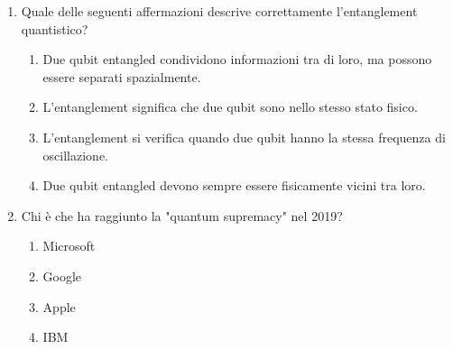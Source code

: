 \documentclass[10pt]{article}
\begin{document}
\begin{enumerate}[label=\textbf{Domanda \arabic*.}]
\item Quale delle seguenti affermazioni descrive correttamente l'entanglement quantistico?
\begin{enumerate}[label=\Alph*.]
    \item Due qubit entangled condividono informazioni tra di loro, ma possono essere separati spazialmente.
    \item L'entanglement significa che due qubit sono nello stesso stato fisico.
    \item L'entanglement si verifica quando due qubit hanno la stessa frequenza di oscillazione.
    \item Due qubit entangled devono sempre essere fisicamente vicini tra loro.
\end{enumerate}



\item Chi è che ha raggiunto la "quantum supremacy" nel 2019?
\begin{enumerate}[label=\Alph*.]
    \item Microsoft
    \item Google
    \item Apple
    \item IBM
\end{enumerate}

\end{enumerate}
\end{document}
